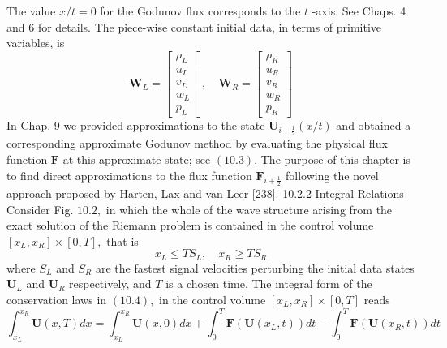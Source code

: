 The value $x / t=0$ for the Godunov flux corresponds to the $t$ -axis. See Chaps. 4 and 6 for details. The piece-wise constant initial data, in terms of primitive variables, is
$$
\mathbf{W}_{L}=\left[\begin{array}{c}
\rho_{L} \\
u_{L} \\
v_{L} \\
w_{L} \\
p_{L}
\end{array}\right], \quad \mathbf{W}_{R}=\left[\begin{array}{c}
\rho_{R} \\
u_{R} \\
v_{R} \\
w_{R} \\
p_{R}
\end{array}\right]
$$
In Chap. 9 we provided approximations to the state $\mathbf{U}_{i+\frac{1}{2}}(x / t)$ and obtained a corresponding approximate Godunov method by evaluating the physical flux function $\mathbf{F}$ at this approximate state; see $(10.3) .$ The purpose of this chapter is to find direct approximations to the flux function $\mathbf{F}_{i+\frac{1}{2}}$ following the novel approach proposed by Harten, Lax and van Leer [238].
10.2.2 Integral Relations
Consider Fig. $10.2,$ in which the whole of the wave structure arising from the exact solution of the Riemann problem is contained in the control volume $\left[x_{L}, x_{R}\right] \times[0, T],$ that is
$$
x_{L} \leq T S_{L}, \quad x_{R} \geq T S_{R}
$$
where $S_{L}$ and $S_{R}$ are the fastest signal velocities perturbing the initial data states $\mathbf{U}_{L}$ and $\mathbf{U}_{R}$ respectively, and $T$ is a chosen time. The integral form of the conservation laws in $(10.4),$ in the control volume $\left[x_{L}, x_{R}\right] \times[0, T]$ reads
$$
\int_{x_{L}}^{x_{R}} \mathbf{U}(x, T) d x=\int_{x_{L}}^{x_{R}} \mathbf{U}(x, 0) d x+\int_{0}^{T} \mathbf{F}\left(\mathbf{U}\left(x_{L}, t\right)\right) d t-\int_{0}^{T} \mathbf{F}\left(\mathbf{U}\left(x_{R}, t\right)\right) d t
$$

